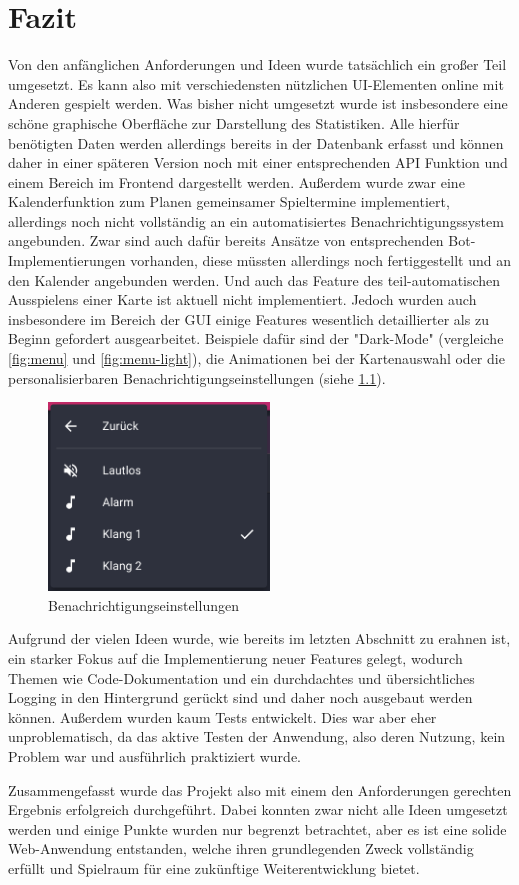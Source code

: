 \chapter{Fazit}
Von den anfänglichen Anforderungen und Ideen wurde tatsächlich ein großer Teil umgesetzt. Es kann also mit verschiedensten nützlichen UI-Elementen online mit Anderen gespielt werden. Was bisher nicht umgesetzt wurde ist insbesondere eine schöne graphische Oberfläche zur Darstellung des Statistiken. Alle hierfür benötigten Daten werden allerdings bereits in der Datenbank erfasst und können daher in einer späteren Version noch mit einer entsprechenden API Funktion und einem Bereich im Frontend dargestellt werden. Außerdem wurde zwar eine Kalenderfunktion zum Planen gemeinsamer Spieltermine implementiert, allerdings noch nicht vollständig an ein automatisiertes Benachrichtigungssystem angebunden. Zwar sind auch dafür bereits Ansätze von entsprechenden Bot-Implementierungen vorhanden, diese müssten allerdings noch fertiggestellt und an den Kalender angebunden werden. Und auch das Feature des teil-automatischen Ausspielens einer Karte ist aktuell nicht implementiert. Jedoch wurden auch insbesondere im Bereich der GUI einige Features wesentlich detaillierter als zu Beginn gefordert ausgearbeitet. Beispiele dafür sind der "Dark-Mode" (vergleiche \cref{fig:menu} und \cref{fig:menu-light}), die Animationen bei der Kartenauswahl oder die personalisierbaren Benachrichtigungseinstellungen (siehe \cref{fig:sound}).

\begin{figure}[h]
	\centering
	\includegraphics[height=5cm]{images/sound.png}
	\caption{Benachrichtigungseinstellungen}
	\label{fig:sound}
\end{figure}

Aufgrund der vielen Ideen wurde, wie bereits im letzten Abschnitt zu erahnen ist, ein starker Fokus auf die Implementierung neuer Features gelegt, wodurch Themen wie Code-Dokumentation und ein durchdachtes und übersichtliches Logging in den Hintergrund gerückt sind und daher noch ausgebaut werden können. Außerdem wurden kaum Tests entwickelt. Dies war aber eher unproblematisch, da das aktive Testen der Anwendung, also deren Nutzung, kein Problem war und ausführlich praktiziert wurde.

Zusammengefasst wurde das Projekt also mit einem den Anforderungen gerechten Ergebnis erfolgreich durchgeführt. Dabei konnten zwar nicht alle Ideen umgesetzt werden und einige Punkte wurden nur begrenzt betrachtet, aber es ist eine solide Web-Anwendung entstanden, welche ihren grundlegenden Zweck vollständig erfüllt und Spielraum für eine zukünftige Weiterentwicklung bietet.
